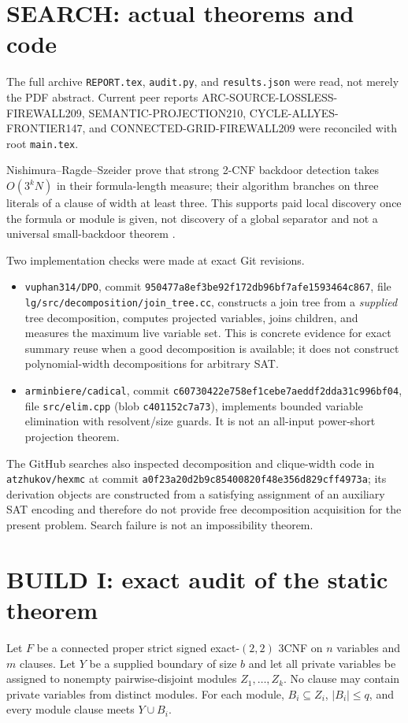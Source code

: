 \documentclass[11pt]{article}
\begin{document}
\section{SEARCH: actual theorems and code}
The full archive \texttt{REPORT.tex}, \texttt{audit.py}, and
\texttt{results.json} were read, not merely the PDF abstract.  Current peer
reports ARC-SOURCE-LOSSLESS-FIREWALL209, SEMANTIC-PROJECTION210,
CYCLE-ALLYES-FRONTIER147, and CONNECTED-GRID-FIREWALL209 were reconciled with
root \texttt{main.tex}.

Nishimura--Ragde--Szeider prove that strong 2-CNF backdoor detection takes
$O(3^kN)$ in their formula-length measure; their algorithm branches on three
literals of a clause of width at least three.  This supports paid local
discovery once the formula or module is given, not discovery of a global
separator and not a universal small-backdoor theorem
\cite{nrs}.

Two implementation checks were made at exact Git revisions.
\begin{itemize}
\item \texttt{vuphan314/DPO}, commit
\texttt{950477a8ef3be92f172db96bf7afe1593464c867}, file
\texttt{lg/src/decomposition/join\_tree.cc}, constructs a join tree from a
\emph{supplied} tree decomposition, computes projected variables, joins
children, and measures the maximum live variable set.  This is concrete
evidence for exact summary reuse when a good decomposition is available; it
does not construct polynomial-width decompositions for arbitrary SAT.
\item \texttt{arminbiere/cadical}, commit
\texttt{c60730422e758ef1cebe7aeddf2dda31c996bf04}, file
\texttt{src/elim.cpp} (blob \texttt{c401152c7a73}), implements bounded
variable elimination with resolvent/size guards.  It is not an all-input
power-short projection theorem.
\end{itemize}
The GitHub searches also inspected decomposition and clique-width code in
\texttt{atzhukov/hexmc} at commit
\texttt{a0f23a20d2b9c85400820f48e356d829cff4973a}; its derivation objects are
constructed from a satisfying assignment of an auxiliary SAT encoding and
therefore do not provide free decomposition acquisition for the present
problem.  Search failure is not an impossibility theorem.

\section{BUILD I: exact audit of the static theorem}
Let $F$ be a connected proper strict signed exact-$(2,2)$ 3CNF on $n$
variables and $m$ clauses.  Let $Y$ be a supplied boundary of size $b$ and
let all private variables be assigned to nonempty pairwise-disjoint modules
$Z_1,\ldots,Z_k$.  No clause may contain private variables from distinct
modules.  For each module, $B_i\subseteq Z_i$, $|B_i|\le q$, and every module
clause meets $Y\cup B_i$.
\end{document}
